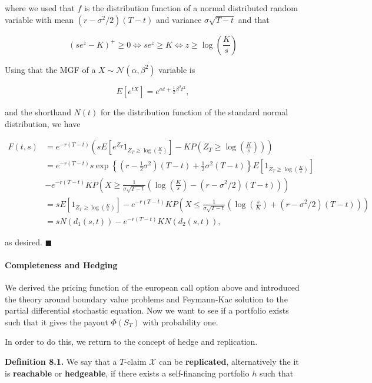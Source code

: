 \documentclass[
]{article}
\begin{document}
where we used that \(f\) is the distribution function of a normal
distributed random variable with mean \((r-\sigma^2/2)(T-t)\) and
variance \(\sigma\sqrt{T-t}\) and that

\[
(se^z-K)^+ \ge 0\iff se^z\ge K\iff z\ge \log\left(\frac{K}{s}\right)
\]

Using that the MGF of a \(X\sim\mathcal{N}(\alpha, \beta^2)\) variable
is

\[
E[e^{tX}]=e^{\alpha t+\frac{1}{2}\beta ^2t^2},
\]

and the shorthand \(N(t)\) for the distribution function of the standard
normal distribution, we have

\begin{align*}
F(t,s)&=e^{-r(T-t)}\left(sE\left[e^{Z_T}1_{Z_T\ge \log\left(\frac{K}{s}\right)}\right]-K P\left(Z_T\ge \log\left(\frac{K}{s}\right)\right)\right)\\
&=e^{-r(T-t)}s\exp\left\{\left(r-\frac{1}{2}\sigma^2\right)(T-t)+\frac{1}{2}\sigma^2(T-t)\right\}E\left[1_{Z_T\ge \log\left(\frac{K}{s}\right)}\right]\\
&-e^{-r(T-t)}K P\left(X\ge\frac{1}{\sigma\sqrt{T-t}}\left( \log\left(\frac{K}{s}\right)-(r-\sigma^2/2)(T-t)\right)\right)\\
&=sE\left[1_{Z_T\ge \log\left(\frac{K}{s}\right)}\right]-e^{-r(T-t)}K P\left(X\le\frac{1}{\sigma\sqrt{T-t}}\left(\log\left(\frac{s}{K}\right)+(r-\sigma^2/2)(T-t)\right)\right)\\
&=sN(d_1(s,t))-e^{-r(T-t)}K N\left(d_2(s,t)\right),
\end{align*}

as desired. \(\blacksquare\)

\hypertarget{completeness-and-hedging}{%
\paragraph{Completeness and Hedging}\label{completeness-and-hedging}}

We derived the pricing function of the european call option above and
introduced the theory around boundary value problems and Feymann-Kac
solution to the partial differential stochastic equation. Now we want to
see if a portfolio exists such that it gives the payout \(\Phi(S_T)\)
with probability one.

In order to do this, we return to the concept of hedge and replication.

\textbf{Definition 8.1.} We say that a \(T\)-claim \(\mathcal{X}\) can
be \textbf{replicated}, alternatively the it is \textbf{reachable} or
\textbf{hedgeable}, if there exists a self-financing portfolio \(h\)
such that
\end{document}
